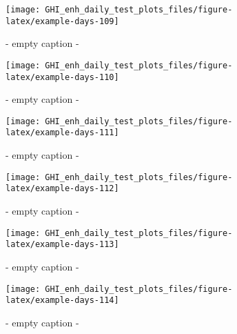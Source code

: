 \documentclass[
  10pt,
  a4paper,oneside]{article}
\begin{document}
\begin{figure}[H]

{\centering \texttt{[image: GHI\_enh\_daily\_test\_plots\_files/figure-latex/example-days-109]} 

}

\caption{ - empty caption - }\label{fig:example-days-109}
\end{figure}

\begin{figure}[H]

{\centering \texttt{[image: GHI\_enh\_daily\_test\_plots\_files/figure-latex/example-days-110]} 

}

\caption{ - empty caption - }\label{fig:example-days-110}
\end{figure}

\begin{figure}[H]

{\centering \texttt{[image: GHI\_enh\_daily\_test\_plots\_files/figure-latex/example-days-111]} 

}

\caption{ - empty caption - }\label{fig:example-days-111}
\end{figure}

\begin{figure}[H]

{\centering \texttt{[image: GHI\_enh\_daily\_test\_plots\_files/figure-latex/example-days-112]} 

}

\caption{ - empty caption - }\label{fig:example-days-112}
\end{figure}

\begin{figure}[H]

{\centering \texttt{[image: GHI\_enh\_daily\_test\_plots\_files/figure-latex/example-days-113]} 

}

\caption{ - empty caption - }\label{fig:example-days-113}
\end{figure}

\begin{figure}[H]

{\centering \texttt{[image: GHI\_enh\_daily\_test\_plots\_files/figure-latex/example-days-114]} 

}

\caption{ - empty caption - }\label{fig:example-days-114}
\end{figure}
\end{document}
